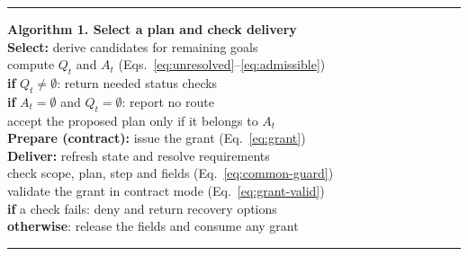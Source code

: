 \begin{table}[t]
\small
\centering
\begin{minipage}{.98\columnwidth}
\hrule\vspace{4pt}
\textbf{Algorithm 1. Select a plan and check delivery}\\[2pt]
\textbf{Select:} derive candidates for remaining goals\\
\hspace*{.75em} compute $Q_t$ and $A_t$ (Eqs.~\ref{eq:unresolved}--\ref{eq:admissible})\\
\hspace*{.75em} \textbf{if} $Q_t\ne\emptyset$: return needed status checks\\
\hspace*{.75em} \textbf{if} $A_t=\emptyset$ and $Q_t=\emptyset$: report no route\\
\hspace*{.75em} accept the proposed plan only if it belongs to $A_t$\\
\textbf{Prepare (contract):} issue the grant (Eq.~\ref{eq:grant})\\
\textbf{Deliver:} refresh state and resolve requirements\\
\hspace*{.75em} check scope, plan, step and fields (Eq.~\eqref{eq:common-guard})\\
\hspace*{.75em} validate the grant in contract mode (Eq.~\eqref{eq:grant-valid})\\
\hspace*{.75em} \textbf{if} a check fails: deny and return recovery options\\
\hspace*{.75em} \textbf{otherwise}: release the fields and consume any grant
\vspace{4pt}\hrule
\end{minipage}
\end{table}

